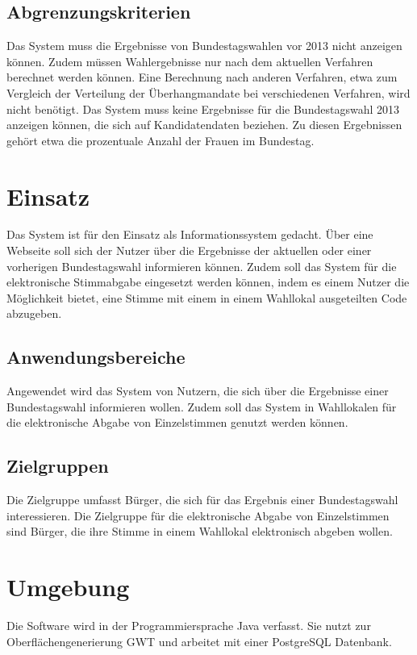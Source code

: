 \documentclass[a4paper]{scrreprt}
\begin{document}
\subsection{Abgrenzungskriterien}

Das System muss die Ergebnisse von Bundestagswahlen vor 2013 nicht anzeigen können. Zudem müssen Wahlergebnisse nur nach dem aktuellen Verfahren berechnet werden können. Eine Berechnung nach anderen Verfahren, etwa zum Vergleich der Verteilung der Überhangmandate bei verschiedenen Verfahren, wird nicht benötigt. Das System muss keine Ergebnisse für die Bundestagswahl 2013 anzeigen können, die sich auf Kandidatendaten beziehen. Zu diesen Ergebnissen gehört etwa die prozentuale Anzahl der Frauen im Bundestag.
 
\section{Einsatz}
Das System ist für den Einsatz als Informationssystem gedacht. Über eine Webseite soll sich der Nutzer über die Ergebnisse der aktuellen oder einer vorherigen Bundestagswahl informieren können. Zudem soll das System für die elektronische Stimmabgabe eingesetzt werden können, indem es einem Nutzer die Möglichkeit bietet, eine Stimme mit einem in einem Wahllokal ausgeteilten Code abzugeben.
 
\subsection{Anwendungsbereiche}
Angewendet wird das System von Nutzern, die sich über die Ergebnisse einer Bundestagswahl informieren wollen. Zudem soll das System in Wahllokalen für die elektronische Abgabe von Einzelstimmen genutzt werden können.
 
\subsection{Zielgruppen}
Die Zielgruppe umfasst Bürger, die sich für das Ergebnis einer Bundestagswahl interessieren. Die Zielgruppe für die elektronische Abgabe von Einzelstimmen sind Bürger, die ihre Stimme in einem Wahllokal elektronisch abgeben wollen. 

\section{Umgebung}
Die Software wird in der Programmiersprache Java verfasst. Sie nutzt zur Oberflächengenerierung GWT und arbeitet mit einer PostgreSQL Datenbank.
 
\end{document}

